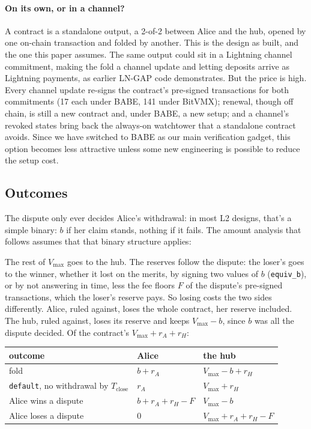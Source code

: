 \documentclass[11pt]{article}
\newcommand{\vmax}{V_{\max}}
\newcommand{\Tc}{T_{\mathrm{close}}}
\newcommand{\tx}[1]{\texttt{#1}}
\begin{document}
\paragraph{On its own, or in a channel?} A contract is a standalone
output, a 2-of-2 between Alice and the hub, opened by one on-chain
transaction and folded by another. This is the design as built, and the
one this paper assumes. The same output could sit in a Lightning channel
commitment, making the fold a channel update and letting deposits arrive
as Lightning payments, as earlier LN-GAP code demonstrates. But the
price is high. Every channel update re-signs the contract's pre-signed
transactions for both commitments (17 each under BABE, 141 under
BitVMX); renewal,
though off chain, is still a new contract and, under BABE, a new setup;
and a channel's revoked states bring back the always-on watchtower that a
standalone contract avoids. Since we have switched to BABE as our main verification gadget, this option becomes less attractive unless some new engineering is possible to reduce the setup cost.
\subsection{Outcomes}
\label{sec:outcomes}

The dispute only ever decides Alice's withdrawal: in most L2 designs, that's a simple binary: $b$ if her claim
stands, nothing if it fails. The amount analysis that follows assumes that that binary structure applies:

The rest of $\vmax$ goes to the hub. The
reserves follow the dispute: the loser's goes to the winner, whether
it lost on the merits, by signing two values of $b$ (\tx{equiv\_b}), or
by not answering in time, less the fee floors $F$ of the dispute's
pre-signed transactions, which the loser's reserve pays. So losing costs
the two sides differently. Alice, ruled against, loses the whole
contract, her reserve included. The hub, ruled against, loses its
reserve and keeps $\vmax - b$, since $b$ was all the dispute decided. Of
the contract's $\vmax + r_A + r_H$:
\begin{center}
\small
\begin{tabular}{lll}
\toprule
outcome & Alice & the hub \\
\midrule
fold & $b + r_A$ & $\vmax - b + r_H$ \\
\tx{default}, no withdrawal by $\Tc$ & $r_A$ & $\vmax + r_H$ \\
Alice wins a dispute\footnotemark & $b + r_A + r_H - F$ & $\vmax - b$ \\
Alice loses a dispute & $0$ & $\vmax + r_A + r_H - F$ \\
\bottomrule
\end{tabular}
\end{center}
\end{document}
